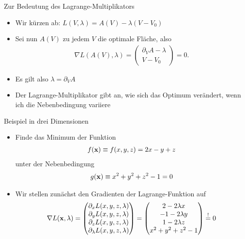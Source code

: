 \begin{frame}{Zur Bedeutung des Lagrange-Multiplikators}
  \begin{itemize}
  \item Wir kürzen ab: $L(V,\lambda) = A(V) - \lambda (V-V_0)$
  \item Sei nun $A(V)$ zu jedem $V$ die optimale Fläche, also
    \begin{gather*}
      \nabla L(A(V),\lambda) =
      \begin{pmatrix}
        \partial_V A - \lambda\\
        V-V_0
      \end{pmatrix}
      = 0.
    \end{gather*}
  \item Es gilt also $\lambda = \partial_V A$
  \item Der Lagrange-Multiplikator gibt an, wie sich das Optimum
    verändert, wenn ich die Nebenbedingung variiere
  \end{itemize}
\end{frame}

\begin{frame}{Beispiel in drei Dimensionen}
  \begin{itemize}
  \item Finde das Minimum der Funktion
  \begin{gather*}
    f(\mathbf{x}) \equiv f(x,y,z) = 2x-y+z
  \end{gather*}
  unter der Nebenbedingung
  \begin{gather*}
    g(\mathbf{x})\equiv x^2+y^2+z^2-1 = 0
  \end{gather*}
  \item Wir stellen zunächst den Gradienten der Lagrange-Funktion auf
    \begin{gather*}
      \nabla L (\mathbf{x},\lambda) =
      \begin{pmatrix}
       \partial_x L (x,y,z,\lambda)\\
       \partial_y L (x,y,z,\lambda)\\
       \partial_z L (x,y,z,\lambda)\\
       \partial_\lambda L (x,y,z,\lambda)
      \end{pmatrix}
      =
      \begin{pmatrix}
        2-2\lambda x\\
        -1-2\lambda y\\
        1-2\lambda z\\
        x^2+y^2+z^2-1
      \end{pmatrix}
      \stackrel!= 0
    \end{gather*}
  \end{itemize}
\end{frame}

